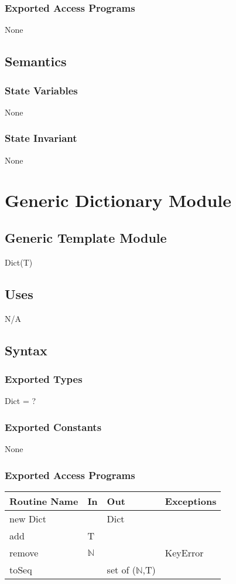 \documentclass[12pt, titlepage]{article}
\begin{document}
\subsubsection*{Exported Access Programs}
None

\subsection*{Semantics}
\subsubsection* {State Variables}
None
\subsubsection* {State Invariant}
None

\newpage

\section*{Generic Dictionary Module}
\subsection*{Generic Template Module}
Dict(T)

\subsection*{Uses}
N/A

\subsection*{Syntax}
\subsubsection*{Exported Types}
Dict = ?
\subsubsection*{Exported Constants}
None
\subsubsection* {Exported Access Programs}
\begin{tabular}{|p{3cm}|p{3cm}|p{3cm}|p{4.5cm}|}
    \hline
    \textbf{Routine Name} & \textbf{In} & \textbf{Out} & \textbf{Exceptions} \\
    \hline
    new Dict & & Dict &\\
    \hline
    add & T & &\\
    \hline
    remove & $\mathbb{N}$ & & KeyError\\
    \hline
    toSeq & & set of ($\mathbb{N}$,T) & \\
    \hline
\end{tabular}
\end{document}
